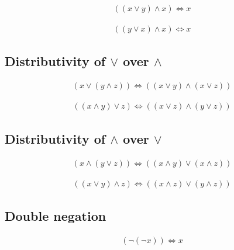 \begin{prop}
\label{Proposition:land_lor_absorption_3}
\begin{align*}
((x \lor y) \land x) \iff x
\end{align*}
\end{prop}

\begin{prop}
\label{Proposition:land_lor_absorption_4}
\begin{align*}
((y \lor x) \land x) \iff x
\end{align*}
\end{prop}

\subsection{Distributivity of $\lor$ over $\land$}
\begin{prop}
\label{Proposition:lor_land_distributivity_1}
\begin{align*}
(x \lor (y \land z)) \iff ((x \lor y) \land (x \lor z))
\end{align*}
\end{prop}

\begin{prop}
\label{Proposition:lor_land_distributivity_2}
\begin{align*}
((x \land y) \lor z) \iff ((x \lor z) \land (y \lor z))
\end{align*}
\end{prop}

\subsection{Distributivity of $\land$ over $\lor$}
\begin{prop}
\label{Proposition:land_lor_distributivity_1}
\begin{align*}
(x \land (y \lor z)) \iff ((x \land y) \lor (x \land z))
\end{align*}
\end{prop}

\begin{prop}
\label{Proposition:land_lor_distributivity_2}
\begin{align*}
((x \lor y) \land z) \iff ((x \land z) \lor (y \land z))
\end{align*}
\end{prop}

\subsection{Double negation}
\begin{prop}
\label{Proposition:double_negation}
\begin{align*}
(\lnot (\lnot x)) \iff x
\end{align*}
\end{prop}


